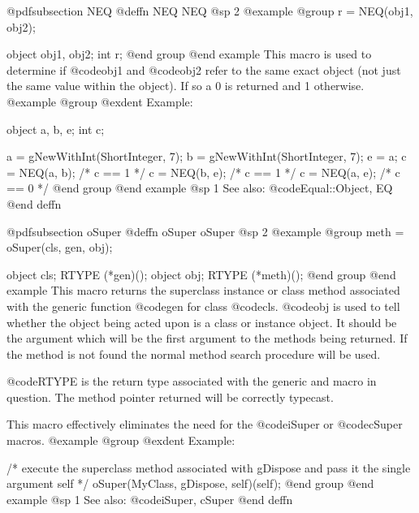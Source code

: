 {{{{@pdfsubsection {NEQ}
@deffn {NEQ} NEQ
@sp 2
@example
@group
r = NEQ(obj1, obj2);

object  obj1, obj2;
int     r;
@end group
@end example
This macro is used to determine if @code{obj1} and @code{obj2} refer to
the same exact object (not just the same value within the object).  If
so a 0 is returned and 1 otherwise.
@example
@group
@exdent Example:

object  a, b, e;
int     c;

a = gNewWithInt(ShortInteger, 7);
b = gNewWithInt(ShortInteger, 7);
e = a;
c = NEQ(a, b);   /* c == 1  */
c = NEQ(b, e);   /* c == 1  */
c = NEQ(a, e);   /* c == 0  */
@end group
@end example
@sp 1
See also:  @code{Equal::Object, EQ}
@end deffn















@pdfsubsection {oSuper}
@deffn {oSuper} oSuper
@sp 2
@example
@group
meth = oSuper(cls, gen, obj);

object  cls;
RTYPE   (*gen)();
object  obj;     
RTYPE   (*meth)();
@end group
@end example
This macro returns the superclass instance or class method associated
with the generic function @code{gen} for class @code{cls}.  @code{obj}
is used to tell whether the object being acted upon is a class or
instance object.  It should be the argument which will be the first
argument to the methods being returned.  If the method is not found the
normal method search procedure will be used.

@code{RTYPE} is the return type associated with the generic and
macro in question.  The method pointer returned will be correctly
typecast.

This macro effectively eliminates the need for the @code{iSuper} or
@code{cSuper} macros.  
@example
@group
@exdent Example:

 /* execute the superclass
    method associated with gDispose
    and pass it the single argument self  */
oSuper(MyClass, gDispose, self)(self);
@end group
@end example
@sp 1
See also:  @code{iSuper, cSuper}
@end deffn













}}}}
